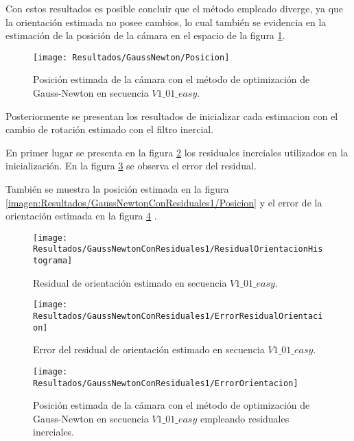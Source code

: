 Con estos resultados es posible concluir que el método empleado diverge, ya que la orientación estimada no posee cambios, lo cual también se evidencia en la estimación de la posición de la cámara en el espacio de la figura \ref{imagen:Resultados/GaussNewton/Posicion}.


\begin{figure}[H]
	\centering
	\texttt{[image: Resultados/GaussNewton/Posicion]}
	\caption{Posición estimada de la cámara con el método de optimización de Gauss-Newton en secuencia $V1\_ 01\_ easy$. }
	\label{imagen:Resultados/GaussNewton/Posicion}
\end{figure}

Posteriormente se presentan los resultados de inicializar cada estimacion con el cambio de rotación estimado con el filtro inercial.

En primer lugar se presenta en la figura \ref{imagen:Resultados/GaussNewtonConResiduales1/ResidualOrientacionHistograma} los residuales inerciales utilizados en la inicialización. En la figura \ref{imagen:Resultados/GaussNewtonConResiduales1/ErrorResidualOrientacion} se observa el error del residual.

También se muestra la posición estimada en la figura \ref{imagen:Resultados/GaussNewtonConResiduales1/Posicion} y el error de la orientación estimada en la figura \ref{imagen:Resultados/GaussNewtonConResiduales1/ErrorOrientacion} .



\begin{figure}[H]
	\centering
	\texttt{[image: Resultados/GaussNewtonConResiduales1/ResidualOrientacionHistograma]}
	\caption{ Residual de orientación estimado en secuencia $V1\_ 01\_ easy$.}
	\label{imagen:Resultados/GaussNewtonConResiduales1/ResidualOrientacionHistograma}
\end{figure}

\begin{figure}[H]
	\centering
	\texttt{[image: Resultados/GaussNewtonConResiduales1/ErrorResidualOrientacion]}
	\caption{ Error del residual de orientación estimado en secuencia $V1\_ 01\_ easy$.}
	\label{imagen:Resultados/GaussNewtonConResiduales1/ErrorResidualOrientacion}
\end{figure}

\begin{figure}[H]
	\centering
	\texttt{[image: Resultados/GaussNewtonConResiduales1/ErrorOrientacion]}
	\caption{Posición estimada de la cámara con el método de optimización de Gauss-Newton en secuencia $V1\_ 01\_ easy$ empleando residuales inerciales. }
	\label{imagen:Resultados/GaussNewtonConResiduales1/ErrorOrientacion}
\end{figure}


